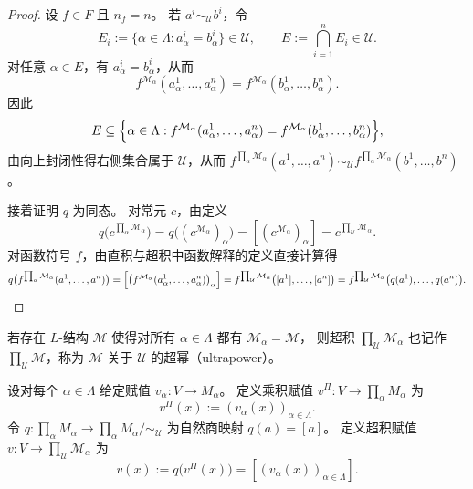 \documentclass[lang=cn,a4paper,newtx,section]{elegantbook}
\begin{document}
 \begin{proof}
 设 $f\in F$ 且 $n_f=n$。
 若 $a^{i}\sim_{\mathcal U} b^{i}$，令
 \[
   E_i:=\{\alpha\in\Lambda: a^{i}_{\alpha}=b^{i}_{\alpha}\}\in\mathcal U,\qquad E:=\bigcap_{i=1}^{n}E_i\in\mathcal U.
 \]
 对任意 $\alpha\in E$，有 $a^{i}_{\alpha}=b^{i}_{\alpha}$，从而
 \[
   f^{\mathcal M_{\alpha}}(a^{1}_{\alpha},\dots,a^{n}_{\alpha})=f^{\mathcal M_{\alpha}}(b^{1}_{\alpha},\dots,b^{n}_{\alpha}).
 \]
 因此
 \[
   E\subseteq\Bigl\{\alpha\in\Lambda: f^{\mathcal M_{\alpha}}(a^{1}_{\alpha},\dots,a^{n}_{\alpha})=f^{\mathcal M_{\alpha}}(b^{1}_{\alpha},\dots,b^{n}_{\alpha})\Bigr\},
 \]
 由向上封闭性得右侧集合属于 $\mathcal U$，从而
 $f^{\prod_{\alpha}\mathcal M_{\alpha}}(a^{1},\dots,a^{n})\sim_{\mathcal U} f^{\prod_{\alpha}\mathcal M_{\alpha}}(b^{1},\dots,b^{n})$。

 接着证明 $q$ 为同态。
 对常元 $c$，由定义
 \[
   q\bigl(c^{\prod_{\alpha}\mathcal M_{\alpha}}\bigr)=q\bigl((c^{\mathcal M_{\alpha}})_{\alpha}\bigr)=[(c^{\mathcal M_{\alpha}})_{\alpha}]=c^{\prod_{\mathcal U}\mathcal M_{\alpha}}.
 \]
 对函数符号 $f$，由直积与超积中函数解释的定义直接计算得
 \[
   q\bigl(f^{\prod_{\alpha}\mathcal M_{\alpha}}(a^{1},\dots,a^{n})\bigr)
   =\Bigl[\bigl(f^{\mathcal M_{\alpha}}(a^{1}_{\alpha},\dots,a^{n}_{\alpha})\bigr)_{\alpha}\Bigr]
   =f^{\prod_{\mathcal U}\mathcal M_{\alpha}}\bigl([a^{1}],\dots,[a^{n}]\bigr)
   =f^{\prod_{\mathcal U}\mathcal M_{\alpha}}\bigl(q(a^{1}),\dots,q(a^{n})\bigr).
 \]
 \end{proof}

 \begin{definition}[超幂]
 \label{ultrapower}
 若存在 $L$-结构 $\mathcal M$ 使得对所有 $\alpha\in\Lambda$ 都有 $\mathcal M_{\alpha}=\mathcal M$，
 则超积 $\prod_{\mathcal U}\mathcal M_{\alpha}$ 也记作 $\prod_{\mathcal U}\mathcal M$，称为 $\mathcal M$ 关于 $\mathcal U$ 的超幂（ultrapower）。
 \end{definition}

 \begin{definition}[乘积赋值与超积赋值]
 \label{ultraproduct-assignment}
 设对每个 $\alpha\in\Lambda$ 给定赋值 $v_{\alpha}:V\to M_{\alpha}$。
 定义乘积赋值 $v^{\Pi}:V\to\prod_{\alpha}M_{\alpha}$ 为
 \[
   v^{\Pi}(x):=(v_{\alpha}(x))_{\alpha\in\Lambda}.
 \]
 令 $q:\prod_{\alpha}M_{\alpha}\to\prod_{\alpha}M_{\alpha}/\!\sim_{\mathcal U}$ 为自然商映射 $q(a)=[a]$。
 定义超积赋值 $v:V\to\prod_{\mathcal U}\mathcal M_{\alpha}$ 为
 \[
   v(x):=q\bigl(v^{\Pi}(x)\bigr)=[(v_{\alpha}(x))_{\alpha\in\Lambda}].
 \]
 \end{definition}
\end{document}
